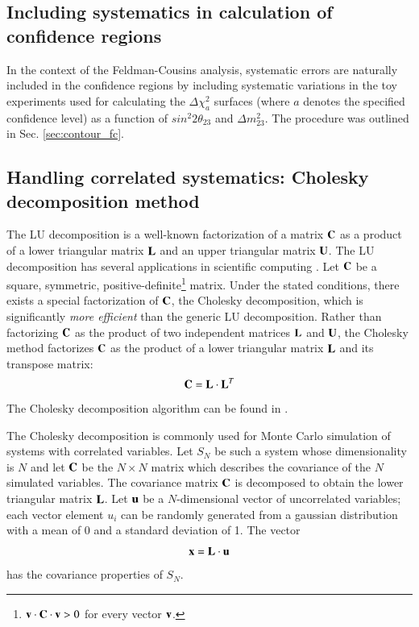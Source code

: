 \subsection {Including systematics in calculation of confidence regions}

In the context of the Feldman-Cousins analysis, systematic errors are naturally included in
the confidence regions by including systematic variations in the toy experiments used for
calculating the $\Delta\chi^{2}_{a}$ surfaces (where $a$ denotes the specified confidence level)
as a function of $sin^{2}2\theta_{23}$ and $\Delta m^{2}_{23}$. 
The procedure was outlined in Sec. \ref{sec:contour_fc}.

\subsection {Handling correlated systematics: Cholesky decomposition method}
\label{sec:cholesky}

The LU decomposition is a well-known factorization of a matrix ${\bf C}$
as a product of a lower triangular matrix ${\bf L}$ and an upper triangular matrix ${\bf U}$.
The LU decomposition has several applications in scientific computing \cite{NumRecipCholesky}.
Let ${\bf C}$ be a square, symmetric, positive-definite\footnote{
  ${\bf v} \cdot {\bf C} \cdot {\bf v} > 0$ for every vector ${\bf v}$.} matrix.
Under the stated conditions, there exists a special factorization of ${\bf C}$, the Cholesky decomposition,
which is significantly {\em more efficient} than the generic LU decomposition.
Rather than factorizing ${\bf C}$ as the product of two independent matrices ${\bf L}$ and ${\bf U}$,
the Cholesky method factorizes ${\bf C}$ as the product 
of a lower triangular matrix ${\bf L}$ and its transpose matrix:
\begin{equation}
\displaystyle 
  {\bf C} = {\bf L} \cdot {\bf L}^{T} 
\end{equation}
The Cholesky decomposition algorithm can be found in \cite{NumRecipCholesky}.

The Cholesky decomposition is commonly used for Monte Carlo simulation of systems with correlated variables.
Let $S_{N}$ be such a system whose dimensionality is $N$
and let ${\bf C}$ be the $N \times N$ matrix which describes the covariance of the 
$N$ simulated variables.
The covariance matrix ${\bf C}$ is decomposed to obtain the lower triangular matrix ${\bf L}$.
Let ${\bf u}$ be a $N$-dimensional vector of uncorrelated variables;
each vector element $u_{i}$ can be randomly generated from a gaussian
distribution with a mean of 0 and a standard deviation of 1.
The vector
\begin{equation}
\displaystyle 
  {\bf x} = {\bf L} \cdot {\bf u}
\end{equation}
has the covariance properties of $S_{N}$.


